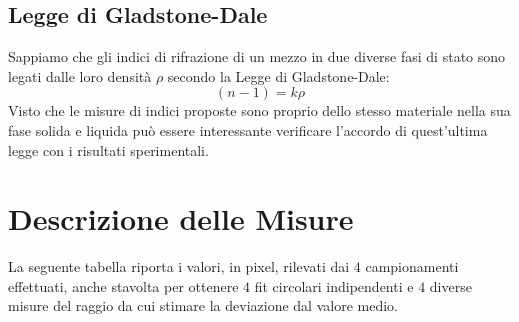 \documentclass{report}[a4paper,11pt]
\begin{document}
\subsection*{Legge di Gladstone-Dale}
Sappiamo che gli indici di rifrazione di un mezzo in due diverse fasi di stato sono legati dalle loro densità $\rho$ secondo la Legge di Gladstone-Dale:
\begin{equation}\label{eq:Glad}
(n-1) = k \rho
\end{equation}
Visto che le misure di indici proposte sono proprio dello stesso materiale nella sua fase solida e liquida può essere interessante verificare l'accordo di quest'ultima legge con i risultati sperimentali.
\section{Descrizione delle Misure}
La seguente tabella riporta i valori, in pixel, rilevati dai $4$ campionamenti effettuati, anche stavolta per ottenere $4$ fit circolari indipendenti e $4$ diverse misure del raggio da cui stimare la deviazione dal valore medio.
\end{document}
